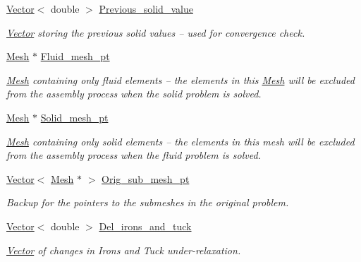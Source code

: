 \begin{DoxyCompactItemize}
\hyperlink{classoomph_1_1Vector}{Vector}$<$ double $>$ \hyperlink{classoomph_1_1SegregatableFSIProblem_a6e056ff378e38504d5e9d522820ca8cf}{Previous\+\_\+solid\+\_\+value}
\begin{DoxyCompactList}\small\item\em \hyperlink{classoomph_1_1Vector}{Vector} storing the previous solid values -- used for convergence check. \end{DoxyCompactList}\item 
\hyperlink{classoomph_1_1Mesh}{Mesh} $\ast$ \hyperlink{classoomph_1_1SegregatableFSIProblem_ada29fa4ef2ae7b6460887f8f04eba6bf}{Fluid\+\_\+mesh\+\_\+pt}
\begin{DoxyCompactList}\small\item\em \hyperlink{classoomph_1_1Mesh}{Mesh} containing only fluid elements -- the elements in this \hyperlink{classoomph_1_1Mesh}{Mesh} will be excluded from the assembly process when the solid problem is solved. \end{DoxyCompactList}\item 
\hyperlink{classoomph_1_1Mesh}{Mesh} $\ast$ \hyperlink{classoomph_1_1SegregatableFSIProblem_a3e7f6f5452767279d21ccbfc6336ef12}{Solid\+\_\+mesh\+\_\+pt}
\begin{DoxyCompactList}\small\item\em \hyperlink{classoomph_1_1Mesh}{Mesh} containing only solid elements -- the elements in this mesh will be excluded from the assembly process when the fluid problem is solved. \end{DoxyCompactList}\item 
\hyperlink{classoomph_1_1Vector}{Vector}$<$ \hyperlink{classoomph_1_1Mesh}{Mesh} $\ast$ $>$ \hyperlink{classoomph_1_1SegregatableFSIProblem_a13ff18eb51b4eeb727443931cd19bac9}{Orig\+\_\+sub\+\_\+mesh\+\_\+pt}
\begin{DoxyCompactList}\small\item\em Backup for the pointers to the submeshes in the original problem. \end{DoxyCompactList}\item 
\hyperlink{classoomph_1_1Vector}{Vector}$<$ double $>$ \hyperlink{classoomph_1_1SegregatableFSIProblem_a8f4545c1a2647486d550499aa89e3136}{Del\+\_\+irons\+\_\+and\+\_\+tuck}
\begin{DoxyCompactList}\small\item\em \hyperlink{classoomph_1_1Vector}{Vector} of changes in Irons and Tuck under-\/relaxation. \end{DoxyCompactList}\item 

\end{DoxyCompactItemize}
